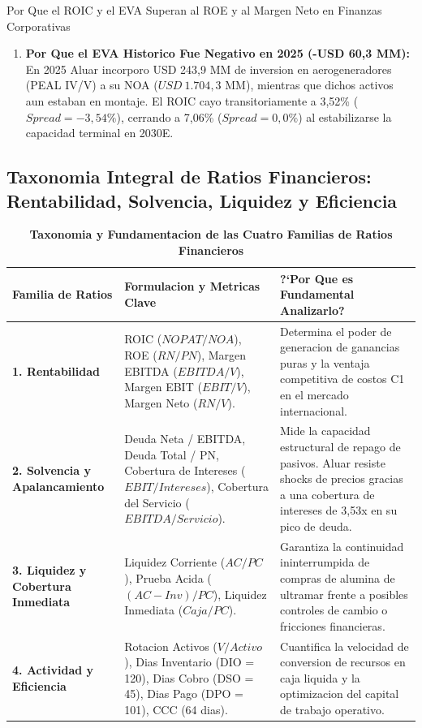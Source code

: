 \documentclass[10pt,a4paper]{article}
\theoremstyle{definition}
\begin{document}
\begin{conceptbox}{Por Que el ROIC y el EVA Superan al ROE y al Margen Neto en Finanzas Corporativas}
\begin{enumerate}
\begin{itemize}
        \item Si $ROIC < WACC$: Crecer destruye valor, ya que cada nueva tonelada producida exige mas capital del que remunera a los inversores ($Spread < 0$).
    \end{itemize}
    \item \textbf{Por Que el EVA Historico Fue Negativo en 2025 (-USD 60,3 MM):} En 2025 Aluar incorporo USD 243,9 MM de inversion en aerogeneradores (PEAL IV/V) a su NOA ($USD\ 1.704,3\text{ MM}$), mientras que dichos activos aun estaban en montaje. El ROIC cayo transitoriamente a 3,52\% ($Spread = -3,54\%$), cerrando a 7,06\% ($Spread = 0,0\%$) al estabilizarse la capacidad terminal en 2030E.
\end{enumerate}
\end{conceptbox}

\subsection{Taxonomia Integral de Ratios Financieros: Rentabilidad, Solvencia, Liquidez y Eficiencia}

\begin{table}[H]
\centering
\caption{\textbf{Taxonomia y Fundamentacion de las Cuatro Familias de Ratios Financieros}}
\small
\begin{tabularx}{\textwidth}{p{3.2cm}Xp{4.5cm}}
\toprule
\textbf{Familia de Ratios} & \textbf{Formulacion y Metricas Clave} & \textbf{?`Por Que es Fundamental Analizarlo?} \\
\midrule
\textbf{1. Rentabilidad} & ROIC ($NOPAT/NOA$), ROE ($RN/PN$), Margen EBITDA ($EBITDA/V$), Margen EBIT ($EBIT/V$), Margen Neto ($RN/V$). & Determina el poder de generacion de ganancias puras y la ventaja competitiva de costos C1 en el mercado internacional. \\
\midrule
\textbf{2. Solvencia y Apalancamiento} & Deuda Neta / EBITDA, Deuda Total / PN, Cobertura de Intereses ($EBIT/Intereses$), Cobertura del Servicio ($EBITDA/Servicio$). & Mide la capacidad estructural de repago de pasivos. Aluar resiste shocks de precios gracias a una cobertura de intereses de 3,53x en su pico de deuda. \\
\midrule
\textbf{3. Liquidez y Cobertura Inmediata} & Liquidez Corriente ($AC/PC$), Prueba Acida ($(AC - Inv)/PC$), Liquidez Inmediata ($Caja/PC$). & Garantiza la continuidad ininterrumpida de compras de alumina de ultramar frente a posibles controles de cambio o fricciones financieras. \\
\midrule
\textbf{4. Actividad y Eficiencia} & Rotacion Activos ($V/Activo$), Dias Inventario (DIO = 120), Dias Cobro (DSO = 45), Dias Pago (DPO = 101), CCC (64 dias). & Cuantifica la velocidad de conversion de recursos en caja liquida y la optimizacion del capital de trabajo operativo. \\
\bottomrule
\end{tabularx}
\end{table}
\end{document}
